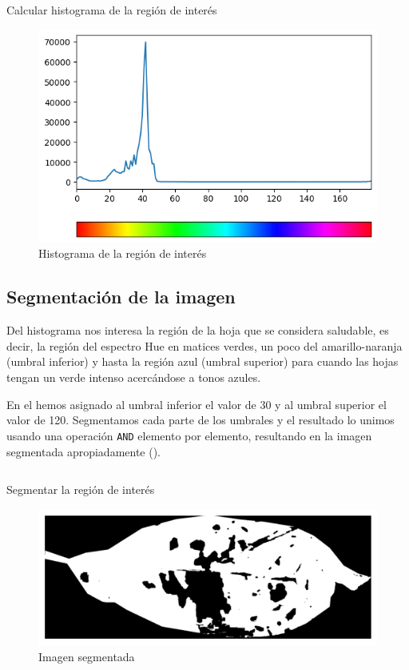 \begin{listing}[H]
\inputminted{python}{code_listings/histogram.py}
\caption{Calcular histograma de la región de interés}
\label{code:histogram}
\end{listing}

\begin{figure}[H]
\centering
\includegraphics[width=\textwidth]{images/histogram.png}
\caption{Histograma de la región de interés}
\label{img:histogram}
\end{figure}

\subsection{Segmentación de la imagen}
\label{sec:segmentation}
Del histograma nos interesa la región de la hoja que se considera saludable, es decir, la región del espectro Hue en matices verdes, un poco del amarillo-naranja (umbral inferior) y hasta la región azul (umbral superior) para cuando las hojas tengan un verde intenso acercándose a tonos azules.

En el  hemos asignado al umbral inferior el valor de 30 y al umbral superior el valor de 120. Segmentamos cada parte de los umbrales y el resultado lo unimos usando una operación \texttt{AND} elemento por elemento, resultando en la imagen segmentada apropiadamente ().

\begin{listing}[H]
\inputminted{python}{code_listings/segmentation.py}
\caption{Segmentar la región de interés}
\label{code:segmentation}
\end{listing}

\begin{figure}[H]
\centering
\includegraphics[scale=1]{images/segmentation.png}
\caption{Imagen segmentada}
\label{img:segmentation}
\end{figure}

